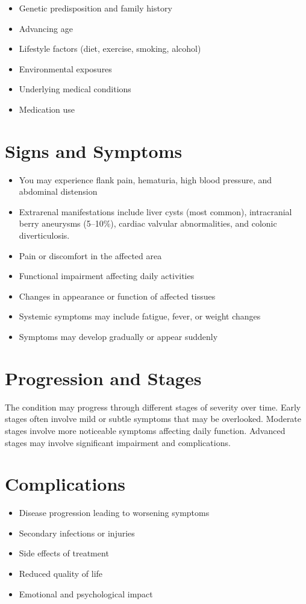\begin{itemize}[noitemsep]
  \item Genetic predisposition and family history
  \item Advancing age
  \item Lifestyle factors (diet, exercise, smoking, alcohol)
  \item Environmental exposures
  \item Underlying medical conditions
  \item Medication use
\end{itemize}
\section{Signs and Symptoms}
\begin{itemize}[noitemsep]
  \item You may experience flank pain, hematuria, high blood pressure, and abdominal distension
  \item Extrarenal manifestations include liver cysts (most common), intracranial berry aneurysms (5--10\%), cardiac valvular abnormalities, and colonic diverticulosis.
  \item Pain or discomfort in the affected area
  \item Functional impairment affecting daily activities
  \item Changes in appearance or function of affected tissues
  \item Systemic symptoms may include fatigue, fever, or weight changes
  \item Symptoms may develop gradually or appear suddenly
\end{itemize}
\section{Progression and Stages}
The condition may progress through different stages of severity over time. Early stages often involve mild or subtle symptoms that may be overlooked. Moderate stages involve more noticeable symptoms affecting daily function. Advanced stages may involve significant impairment and complications.
\section{Complications}
\begin{itemize}[noitemsep]
  \item Disease progression leading to worsening symptoms
  \item Secondary infections or injuries
  \item Side effects of treatment
  \item Reduced quality of life
  \item Emotional and psychological impact
\end{itemize}
